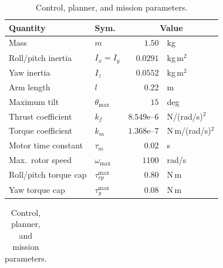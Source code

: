 \documentclass[10pt,letterpaper]{article}
\begin{document}
\begin{table}[tbp]
    \centering
    \begin{minipage}[t]{0.49\textwidth}\centering\footnotesize
        \caption{Airframe and actuator parameters.}
        \label{tab:params}
        \begin{tabular}{llr@{\,}l}
            \toprule
            \textbf{Quantity}     & \textbf{Sym.}      & \multicolumn{2}{c}{\textbf{Value}}                    \\
            \midrule
            Mass                  & $m$                & $1.50$                             & kg               \\
            Roll/pitch inertia    & $I_x\!=\!I_y$      & $0.0291$                           & kg\,m$^2$        \\
            Yaw inertia           & $I_z$              & $0.0552$                           & kg\,m$^2$        \\
            Arm length            & $l$                & $0.22$                             & m                \\
            Maximum tilt          & $\theta_{\max}$    & $15$                               & deg              \\
            Thrust coefficient    & $k_f$              & $8.549$e--6                        & N/(rad/s)$^2$    \\
            Torque coefficient    & $k_m$              & $1.368$e--7                        & N\,m/(rad/s)$^2$ \\
            Motor time constant   & $\tau_m$           & $0.02$                             & s                \\
            Max.\ rotor speed     & $\omega_{\max}$    & $1100$                             & rad/s            \\
            Roll/pitch torque cap & $\tau_{rp}^{\max}$ & $0.80$                             & N\,m             \\
            Yaw torque cap        & $\tau_{y}^{\max}$  & $0.08$                             & N\,m             \\
            \bottomrule
        \end{tabular}
    \end{minipage}\hfill
    \begin{minipage}[t]{0.49\textwidth}\centering\footnotesize
        \caption{Control, planner, and mission parameters.}
        \label{tab:mission}
        \begin{tabular}{llr@{\,}l}

\end{tabular}
\end{minipage}
\end{table}
\end{document}
